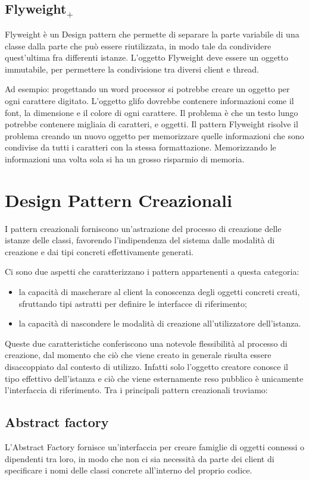 \subsection{Flyweight$_+$}
Flyweight è un Design pattern che permette di separare la parte variabile di una classe dalla parte che può essere riutilizzata, in modo tale da condividere quest'ultima fra differenti istanze. L'oggetto Flyweight deve essere un oggetto immutabile, per permettere la condivisione tra diversi client e thread.

Ad esempio: progettando un word processor si potrebbe creare un oggetto per ogni carattere digitato. L'oggetto glifo dovrebbe contenere informazioni come il font, la dimensione e il colore di ogni carattere. Il problema è che un testo lungo potrebbe contenere migliaia di caratteri, e oggetti. Il pattern Flyweight risolve il problema creando un nuovo oggetto per memorizzare quelle informazioni che sono condivise da tutti i caratteri con la stessa formattazione. Memorizzando le informazioni una volta sola si ha un grosso risparmio di memoria.

\section{Design Pattern Creazionali}
I pattern creazionali forniscono un'astrazione del processo di creazione delle istanze delle classi, favorendo l'indipendenza del sistema dalle modalità di creazione e dai tipi concreti effettivamente generati.

Ci sono due aspetti che caratterizzano i pattern appartenenti a questa categoria:
\begin{itemize}
	\item la capacità di mascherare al client la conoscenza degli oggetti concreti creati, sfruttando tipi astratti per definire le interfacce di riferimento;
	\item la capacità di nascondere le modalità di creazione all'utilizzatore dell'istanza.
\end{itemize}
Queste due caratteristiche conferiscono una notevole flessibilità al processo di creazione, dal momento che ciò che viene creato in generale risulta essere disaccoppiato dal contesto di utilizzo. Infatti solo l'oggetto creatore conosce il tipo effettivo dell'istanza e ciò che viene esternamente reso pubblico è unicamente l'interfaccia di riferimento.
Tra i principali pattern creazionali troviamo:

\subsection{Abstract factory}
L'Abstract Factory fornisce un'interfaccia per creare famiglie di oggetti connessi o dipendenti tra loro, in modo che non ci sia necessità da parte dei client di specificare i nomi delle classi concrete all'interno del proprio codice.

